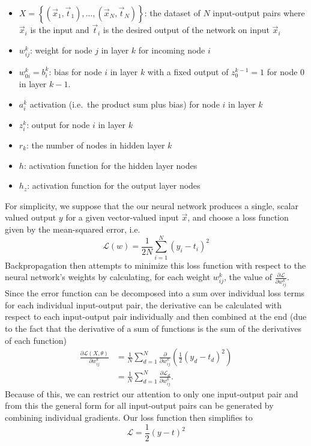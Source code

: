\documentclass[../main.tex]{subfiles}
\begin{document}
\begin{itemize}
  \item $X = {\left\{(\vec{x}_{1}, \vec{t}_{1}), \ldots, (\vec{x}_{N}, \vec{t}_{N})\right\}}$: the dataset of $N$
    input-output pairs where $\vec{x}_{i}$ is the input and $\vec{t}_{i}$ is the desired output of the network on input
    $\vec{x}_{i}$
  \item $w_{ij}^{k}$: weight for node $j$ in layer $k$ for incoming node $i$
  \item $w_{0i}^{k} = b_{i}^{k}$: bias for node $i$ in layer $k$ with a fixed output of $z_{0}^{k-1} = 1$ for node $0$ in layer
      $k-1$.
  \item $a_{i}^{k}$ activation (i.e.\ the product sum plus bias) for node $i$ in layer $k$ 
  \item $z_{i}^{k}$: output for node $i$ in layer $k$
  \item $r_{k}$: the number of nodes in hidden layer $k$
  \item $h$: activation function for the hidden layer nodes
  \item $h_{z}$:  activation function for the output layer nodes
\end{itemize}
%
For simplicity, we suppose that the our neural network produces a single, scalar valued output $y$ for a given
vector-valued input $\vec{x}$, and choose a loss function given by the mean-squared error, i.e.\
%
\begin{equation}
  \mathcal{L}(w) = \frac{1}{2N}\sum_{i=1}^{N}{\left(y_{i} - t_{i}\right)}^{2}
\end{equation}
%
Backpropagation then attempts to minimize this loss function with respect to the neural network's weights by
calculating, for each weight $w_{ij}^{k}$, the value of $\frac{\partial \mathcal{L}}{\partial w_{ij}^{k}}$.
%
Since the error function can be decomposed into a sum over individual loss terms for each individual input-output pair,
the derivative can be calculated with respect to each input-output pair individually and then combined at the end (due
to the fact that the derivative of a sum of functions is the sum of the derivatives of each function)
%
\begin{align}
  \frac{\partial \mathcal{L}(X, \theta)}{\partial w_{ij}^{k}}
    &= \frac{1}{N} \sum_{d = 1}^{N} \frac{\partial}{\partial w_{ij}^{k}} {\left(\frac{1}{2}{(y_d - t_d)}^{2}\right)}\\
    &= \frac{1}{N}\sum_{d=1}^{N}\frac{\partial \mathcal{L}_{d}}{\partial w_{ij}^{k}}.
\end{align}
%
Because of this, we can restrict our attention to only one input-output pair and from this the general form for all
input-output pairs can be generated by combining individual gradients.
%
Our loss function then simplifies to 
%
\begin{equation}
  \mathcal{L} = \frac{1}{2}{(y - t)}^{2}
\end{equation}
%
\end{document}
